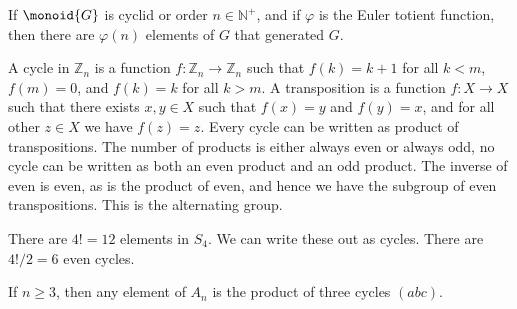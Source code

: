 \documentclass{article}                                                        %
\begin{document}
                \begin{theorem}
                    If $\monoid{G}$ is cyclid or order $n\in\mathbb{N}^{+}$, and
                    if $\varphi$ is the Euler totient function, then there are
                    $\varphi(n)$ elements of $G$ that generated $G$.
                \end{theorem}
                A cycle in $\mathbb{Z}_{n}$ is a function
                $f:\mathbb{Z}_{n}\rightarrow\mathbb{Z}_{n}$ such that
                $f(k)=k+1$ for all $k<m$, $f(m)=0$, and $f(k)=k$ for all $k>m$.
                A transposition is a function $f:X\rightarrow{X}$ such that
                there exists $x,y\in{X}$ such that $f(x)=y$ and $f(y)=x$, and
                for all other $z\in{X}$ we have $f(z)=z$. Every cycle can be
                written as product of transpositions. The number of products is
                either always even or always odd, no cycle can be written as
                both an even product and an odd product. The inverse of even is
                even, as is the product of even, and hence we have the subgroup
                of even transpositions. This is the alternating group.
                \begin{example}
                    There are $4!=12$ elements in $S_{4}$. We can write these
                    out as cycles. There are $4!/2=6$ even cycles.
                \end{example}
                \begin{theorem}
                    If $n\geq{3}$, then any element of $A_{n}$ is the product of
                    three cycles $(abc)$.
                \end{theorem}
\end{document}
